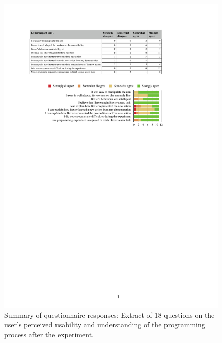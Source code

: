 \begin{figure}[h]
	\centering
	\includegraphics[width=\linewidth]{figures/eEvaluation}
	\caption{Summary of questionnaire responses: Extract of 18 questions on the user's perceived usability and understanding of the programming process after the experiment.}
	\label{fig:eEvaluation}
\end{figure}